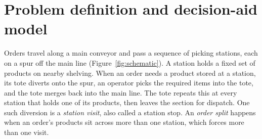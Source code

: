 \documentclass[]{interact}
\begin{document}
\section{Problem definition and decision-aid model}\label{sec:model}
Orders travel along a main conveyor and pass a sequence of picking stations, each on a spur off the main line (Figure~\ref{fig:schematic}). A station holds a fixed set of products on nearby shelving. When an order needs a product stored at a station, its tote diverts onto the spur, an operator picks the required items into the tote, and the tote merges back into the main line. The tote repeats this at every station that holds one of its products, then leaves the section for dispatch. One such diversion is a \emph{station visit}, also called a station stop. An \emph{order split} happens when an order's products sit across more than one station, which forces more than one visit.
\end{document}
